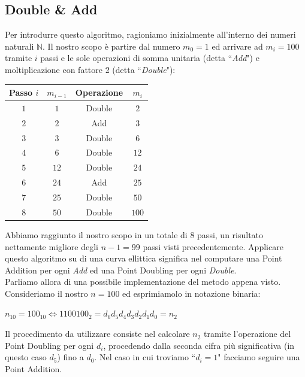 \documentclass[a4paper,12pt]{tesiinfo}
\begin{document}
\subsection{Double \& Add} 
\label{doub add}
Per introdurre questo algoritmo, ragioniamo inizialmente all'interno dei numeri naturali $\mathbb{N}$. Il nostro scopo \`e partire dal numero $m_0=1$ ed arrivare ad $m_i=100$ tramite $i$ passi e le sole operazioni di somma unitaria (detta ``\textit{Add}") e moltiplicazione con fattore 2 (detta ``\textit{Double}"):
\begin{center}
\begin{tabular}{ c | c c c }
 Passo $i$ & $m_{i-1}$ & Operazione & $m_i$\\
 \hline
 $1$ &$1$ & Double &$2$\\
 $2$ &$2$ & Add &$3$\\
 $3$ &$3$ & Double &$6$\\
 $4$ &$6$ & Double &$12$\\
 $5$ &$12$ & Double &$24$\\
 $6$ &$24$ & Add &$25$\\
 $7$ &$25$ & Double &$50$\\
 $8$ &$50$ & Double &$100$\\
\end{tabular}
\end{center}
Abbiamo raggiunto il nostro scopo in un totale di 8 passi, un risultato nettamente migliore degli $n-1=99$ passi visti precedentemente. Applicare questo algoritmo su di una curva ellittica significa nel computare una Point Addition per ogni \textit{Add} ed una Point Doubling per ogni \textit{Double}. 
\\
Parliamo allora di una possibile implementazione del metodo appena visto. Consideriamo il nostro $n = 100$ ed esprimiamolo in notazione binaria:
\begin{center}
 $n_{10} = 100_{10} \iff 1100100_2 = d_6d_5d_4d_3d_2d_1d_0 = n_2$
\end{center} 
Il procedimento da utilizzare consiste nel calcolare $n_2$ tramite l'operazione del Point Doubling per ogni $d_i$, procedendo dalla seconda cifra pi\`u significativa (in questo caso $d_5$) fino a $d_0$. Nel caso in cui troviamo ``$d_i=1$" facciamo seguire una Point Addition. 
\end{document}
